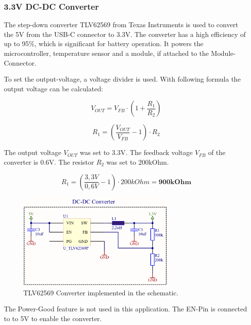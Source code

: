     \subsubsection{3.3V DC-DC Converter}

        The  step-down converter TLV62569 \cite{noauthor_tlv62569_2017} from Texas Instruments is used to convert 
        the 5V from the USB-C connector to 3.3V. The converter has a high efficiency
        of up to 95\%, which is significant for battery operation. It powers the
        microcontroller, temperature sensor and a module, if attached to the
        Module-Connector.

        To set the output-voltage, a voltage divider is used. With following formula
        the output voltage can be calculated:

    \begin{equation}
        V_{OUT} = V_{FB} \cdot (1 + \frac{R_1}{R_2}) 
    \end{equation}

    \begin{equation}
        R_1 = (\frac{V_{OUT}}{V_{FB}} - 1) \cdot {R_2} 
    \end{equation}

        The output voltage $V_{OUT}$ was set to 3.3V. The feedback voltage $V_{FB}$ 
        of the converter is 0.6V. The resistor $R_2$ was set to 200kOhm.

    \begin{equation}
        R_1 = (\frac{3,3V}{0,6V} - 1) \cdot {200kOhm} = \textbf{900kOhm}
    \end{equation}
    
    \begin{figure}[H]
        \centering
        \includegraphics[width=0.7\textwidth]{assets/HW/DC-DC-schematic.png}
        \caption{TLV62569 Converter implemented in the schematic.}
    \end{figure}

        The Power-Good feature is not used in this application. The EN-Pin is connected to 
        to 5V to enable the converter.

